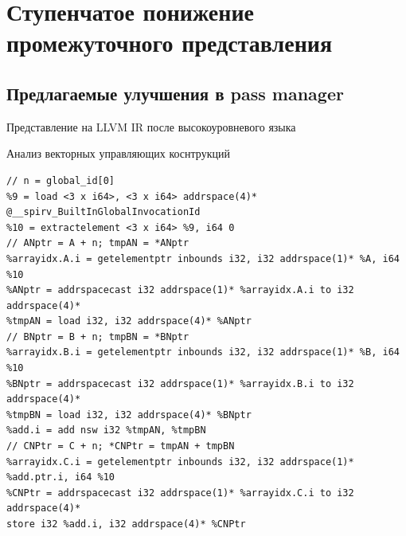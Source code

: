 \chapter{Ступенчатое понижение промежуточного представления}\label{ch:lowering}

\section{Предлагаемые улучшения в pass manager}\label{sec:lowering/passes}

Представление на LLVM IR после высокоуровневого языка

\begin{ListingEnv}[!h]
    \captiondelim{ } 
    \caption{Анализ векторных управляющих коснтрукций}\label{lst:simdcf-analysis}
    \begin{verbatim}
// n = global_id[0]
%9 = load <3 x i64>, <3 x i64> addrspace(4)* @__spirv_BuiltInGlobalInvocationId
%10 = extractelement <3 x i64> %9, i64 0
// ANptr = A + n; tmpAN = *ANptr
%arrayidx.A.i = getelementptr inbounds i32, i32 addrspace(1)* %A, i64 %10
%ANptr = addrspacecast i32 addrspace(1)* %arrayidx.A.i to i32 addrspace(4)*
%tmpAN = load i32, i32 addrspace(4)* %ANptr
// BNptr = B + n; tmpBN = *BNptr
%arrayidx.B.i = getelementptr inbounds i32, i32 addrspace(1)* %B, i64 %10
%BNptr = addrspacecast i32 addrspace(1)* %arrayidx.B.i to i32 addrspace(4)*
%tmpBN = load i32, i32 addrspace(4)* %BNptr
%add.i = add nsw i32 %tmpAN, %tmpBN
// CNPtr = C + n; *CNPtr = tmpAN + tmpBN
%arrayidx.C.i = getelementptr inbounds i32, i32 addrspace(1)* %add.ptr.i, i64 %10
%CNPtr = addrspacecast i32 addrspace(1)* %arrayidx.C.i to i32 addrspace(4)*
store i32 %add.i, i32 addrspace(4)* %CNPtr
    \end{verbatim}
\end{ListingEnv}



